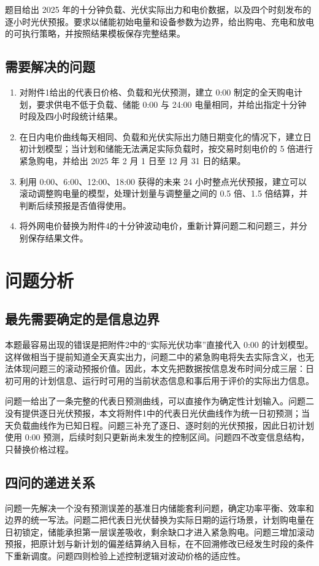 \documentclass[withoutpreface]{cumcmthesis}
\begin{document}
题目给出 2025 年的十分钟负载、光伏实际出力和电价数据，以及四个时刻发布的逐小时光伏预报。要求以储能初始电量和设备参数为边界，给出购电、充电和放电的可执行策略，并按照结果模板保存完整结果。

\subsection{需要解决的问题}
\begin{enumerate}[itemindent=2em]
    \item 对附件1给出的代表日价格、负载和光伏预测，建立 0:00 制定的全天购电计划，要求供电不低于负载、储能 0:00 与 24:00 电量相同，并给出指定十分钟时段及四小时段统计结果。
    \item 在日内电价曲线每天相同、负载和光伏实际出力随日期变化的情况下，建立日初计划模型；当计划和储能无法满足实际负载时，按交易时刻电价的 5 倍进行紧急购电，并给出 2025 年 2 月 1 日至 12 月 31 日的结果。
    \item 利用 0:00、6:00、12:00、18:00 获得的未来 24 小时整点光伏预报，建立可以滚动调整购电量的模型，处理计划量与调整量之间的 0.5 倍、1.5 倍结算，并判断后续预报是否值得使用。
    \item 将外网电价替换为附件4的十分钟波动电价，重新计算问题二和问题三，并分别保存结果文件。
\end{enumerate}

\section{问题分析}
\subsection{最先需要确定的是信息边界}
本题最容易出现的错误是把附件2中的“实际光伏功率”直接代入 0:00 的计划模型。这样做相当于提前知道全天真实出力，问题二中的紧急购电将失去实际含义，也无法体现问题三的滚动预报价值。因此，本文先把数据按信息发布时间分成三层：日初可用的计划信息、运行时可用的当前状态信息和事后用于评价的实际出力信息。

问题一给出了一条完整的代表日预测曲线，可以直接作为确定性计划输入。问题二没有提供逐日光伏预报，本文将附件1中的代表日光伏曲线作为统一日初预测；当天负载曲线作为已知日程。问题三补充了逐日、逐时刻的光伏预报，因此日初计划使用 0:00 预测，后续时刻只更新尚未发生的控制区间。问题四不改变信息结构，只替换价格过程。

\subsection{四问的递进关系}
问题一先解决一个没有预测误差的基准日内储能套利问题，确定功率平衡、效率和边界的统一写法。问题二把代表日光伏替换为实际日期的运行场景，计划购电量在日初锁定，储能承担第一层误差吸收，剩余缺口才进入紧急购电。问题三增加滚动预报，把原计划与新计划的偏差结算纳入目标，在不回溯修改已经发生时段的条件下重新调度。问题四则检验上述控制逻辑对波动价格的适应性。
\end{document}
